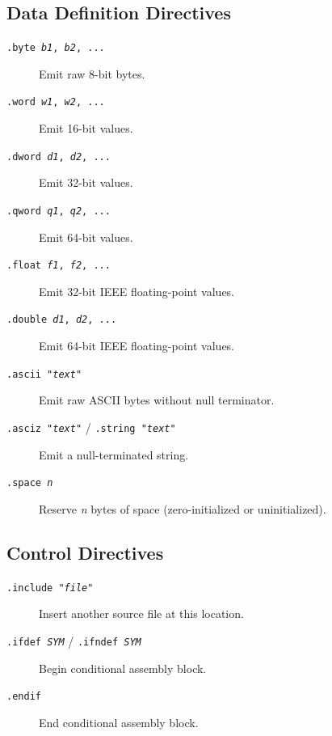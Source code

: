 \documentclass[12pt]{article}
\begin{document}
\subsection{Data Definition Directives}

\begin{description}
\item[\texttt{.byte \textit{b1}, \textit{b2}, ...}] Emit raw 8-bit bytes.

\item[\texttt{.word \textit{w1}, \textit{w2}, ...}] Emit 16-bit values.

\item[\texttt{.dword \textit{d1}, \textit{d2}, ...}] Emit 32-bit values.

\item[\texttt{.qword \textit{q1}, \textit{q2}, ...}] Emit 64-bit values.

\item[\texttt{.float \textit{f1}, \textit{f2}, ...}] Emit 32-bit IEEE floating-point values.

\item[\texttt{.double \textit{d1}, \textit{d2}, ...}] Emit 64-bit IEEE floating-point values.

\item[\texttt{.ascii "\textit{text}"}] Emit raw ASCII bytes without null terminator.

\item[\texttt{.asciz "\textit{text}"} / \texttt{.string "\textit{text}"}] Emit a null-terminated string.

\item[\texttt{.space \textit{n}}] Reserve \textit{n} bytes of space (zero-initialized or uninitialized).
\end{description}

\subsection{Control Directives}

\begin{description}
\item[\texttt{.include "\textit{file}"}] Insert another source file at this location.

\item[\texttt{.ifdef \textit{SYM}} / \texttt{.ifndef \textit{SYM}}] Begin conditional assembly block.

\item[\texttt{.endif}] End conditional assembly block.
\end{description}
\end{document}
